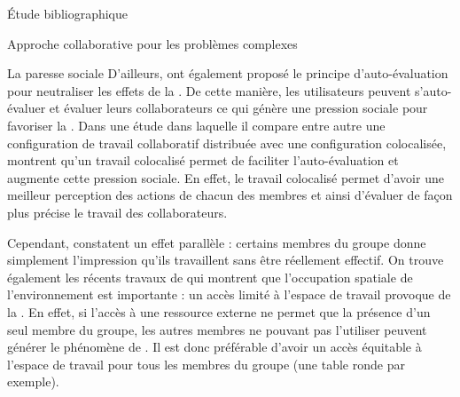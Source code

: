 \documentclass[myfrancais,ngerman,english,french]{mythesis}
\begin{document}
\begin{mychapter}{Étude bibliographique}
\begin{mysection}{Approche collaborative pour les problèmes complexes}
\begin{mysubsection}{La paresse sociale}
				D'ailleurs,  ont également proposé le principe d'auto-évaluation pour neutraliser les effets de la .
				De cette manière, les utilisateurs peuvent s'auto-évaluer et évaluer leurs collaborateurs ce qui génère une pression sociale pour favoriser la  .
				Dans une étude dans laquelle il compare entre autre une configuration de travail collaboratif distribuée avec une configuration colocalisée,  montrent qu'un travail colocalisé permet de faciliter l'auto-évaluation et augmente cette pression sociale.
				En effet, le travail colocalisé permet d'avoir une meilleur perception des actions de chacun des membres et ainsi d'évaluer de façon plus précise le travail des collaborateurs.

				Cependant,  constatent un effet parallèle : certains membres du groupe donne simplement l'impression qu'ils travaillent sans être réellement effectif.
				On trouve également les récents travaux de  qui montrent que l'occupation spatiale de l'environnement est importante : un accès limité à l'espace de travail provoque de la .
				En effet, si l'accès à une ressource externe ne permet que la présence d'un seul membre du groupe, les autres membres ne pouvant pas l'utiliser peuvent générer le phénomène de .
				Il est donc préférable d'avoir un accès équitable à l'espace de travail pour tous les membres du groupe (une table ronde par exemple).


\end{mysubsection}
\end{mysection}
\end{mychapter}
\end{document}

